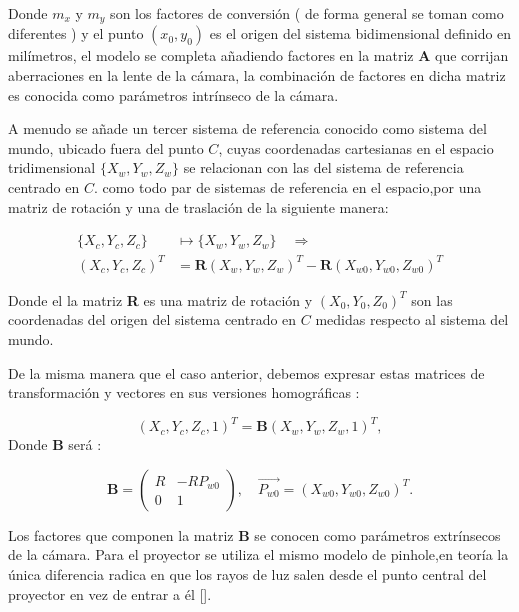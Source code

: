 \documentclass[UTF8]{article}
\begin{document}
%
Donde $m_{x}$ y $m_{y}$ son los factores de conversión ( de forma general se toman como diferentes ) y el punto $(x_{0},y_{0})$ es el origen del sistema bidimensional definido en milímetros, el modelo se completa añadiendo factores en la matriz $\textbf{A}$ que corrijan aberraciones en la lente de la cámara, la combinación de factores en dicha matriz es conocida como parámetros intrínseco de la cámara.

%
A menudo se añade un tercer sistema de referencia conocido como sistema del mundo, ubicado fuera del punto $C$, cuyas coordenadas cartesianas en el espacio tridimensional $\{X_{w},Y_{w},Z_{w}\}$ se relacionan con las del sistema de referencia centrado en $C$. como todo par de sistemas de referencia en el espacio,por una matriz de rotación y una de traslación de la siguiente manera:
\medskip

\begin{align}
  \{X_{c},Y_{c},Z_{c}\} &\mapsto   \{X_{w},Y_{w},Z_{w}\}  \quad \Rightarrow \\
     (X_{c},Y_{c},Z_{c})^T  &= \mathbf{R} (X_{w},Y_{w},Z_{w})^T- \mathbf{R} (X_{w0},Y_{w0},Z_{w0})^T
\end{align}

%
Donde el la matriz \textbf{R} es una matriz de rotación y $(X_{0},Y_{0},Z_{0})^T$ son las coordenadas del origen del sistema centrado en $C$ medidas respecto al sistema del mundo.

%
De la misma manera que el caso anterior, debemos expresar estas matrices de transformación y vectores en sus versiones homográficas : 
\medskip

\begin{equation}
     (X_{c},Y_{c},Z_{c},1)^T  = \mathbf{B} (X_{w},Y_{w},Z_{w},1)^T ,
\end{equation}
Donde \textbf{B} será :

\begin{equation}
    \mathbf{B}   = \left( \begin{array}{cc}
R & -RP_{w0}\\
0 & 1\end{array} \right), \quad \vec{P_{w0}} = (X_{w0},Y_{w0},Z_{w0})^T.
\end{equation}

%
Los factores que componen la matriz \textbf{B} se conocen como parámetros extrínsecos de la cámara.  
%
Para el proyector se utiliza el mismo modelo de pinhole,en teoría la única diferencia radica en que los rayos de luz salen desde el punto central del proyector en vez de entrar a él [].
\medskip
\end{document}
